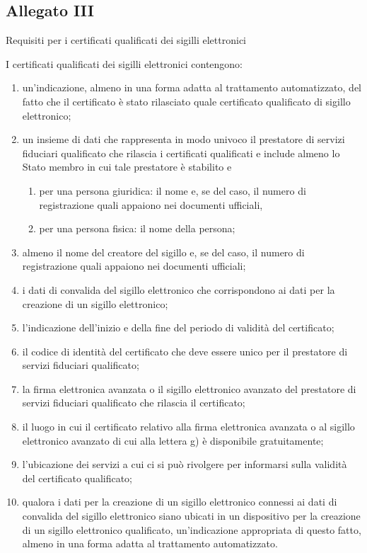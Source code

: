 \subsection*{Allegato III}\label{sec:allegatoIIIreg9102014}
Requisiti per i certificati qualificati dei sigilli elettronici\par 
I certificati qualificati dei sigilli elettronici contengono:
\begin{enumerate}
	\item un’indicazione, almeno in una forma adatta al trattamento automatizzato, del fatto che il certificato è stato rilasciato quale certificato qualificato di sigillo elettronico;
	\item 	
	un insieme di dati che rappresenta in modo univoco il prestatore di servizi fiduciari qualificato che rilascia i certificati qualificati e include almeno lo Stato membro in cui tale prestatore è stabilito e
	\begin{enumerate}
		\item per una persona giuridica: il nome e, se del caso, il numero di registrazione quali appaiono nei documenti ufficiali,
		\item per una persona fisica: il nome della persona;
	\end{enumerate}
\item almeno il nome del creatore del sigillo e, se del caso, il numero di registrazione quali appaiono nei documenti ufficiali;
\item 	
i dati di convalida del sigillo elettronico che corrispondono ai dati per la creazione di un sigillo elettronico;
\item l’indicazione dell’inizio e della fine del periodo di validità del certificato;
\item il codice di identità del certificato che deve essere unico per il prestatore di servizi fiduciari qualificato;
\item la firma elettronica avanzata o il sigillo elettronico avanzato del prestatore di servizi fiduciari qualificato che rilascia il certificato;
\item 	
il luogo in cui il certificato relativo alla firma elettronica avanzata o al sigillo elettronico avanzato di cui alla lettera g) è disponibile gratuitamente;
\item 	
l’ubicazione dei servizi a cui ci si può rivolgere per informarsi sulla validità del certificato qualificato;
\item qualora i dati per la creazione di un sigillo elettronico connessi ai dati di convalida del sigillo elettronico siano ubicati in un dispositivo per la creazione di un sigillo elettronico qualificato, un’indicazione appropriata di questo fatto, almeno in una forma adatta al trattamento automatizzato.
\end{enumerate}
